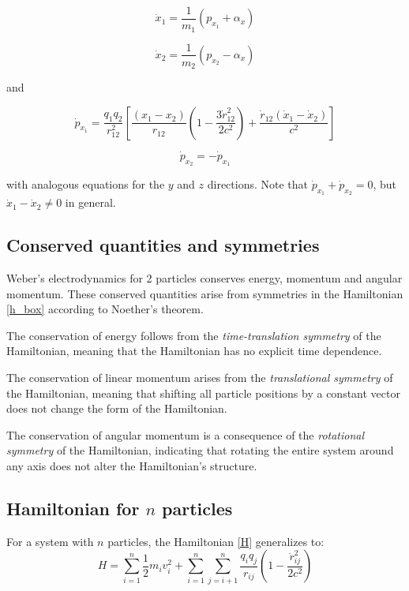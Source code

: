 \documentclass[12pt,a4paper]{article}
\theoremstyle{definition}
\theoremstyle{remark}
\begin{document}
\begin{equation}\label{xdot_two}
    \dot{x}_1 = \frac{1}{m_1} \left(p_{x_1} + \alpha_x\right)
\end{equation}

\begin{equation}\label{xdot_two_p2}
    \dot{x}_2 = \frac{1}{m_2} \left(p_{x_2} - \alpha_x\right)
\end{equation}

and

\begin{equation}\label{pdot_two}
    \dot{p}_{x_1} = \frac{q_1 q_2}{r_{12}^2}\left[\frac{(x_1 - x_2)}{r_{12}}\left(1 - \frac{3\dot{r}_{12}^2}{2 c^2}\right) + \frac{\dot{r}_{12}(\dot{x}_1 - \dot{x}_2)}{c^2}\right]
\end{equation}

\begin{equation}\label{pdot_two_p2}
    \dot{p}_{x_2} = -\dot{p}_{x_1}
\end{equation}

with analogous equations for the $y$ and $z$ directions. Note that $\dot{p}_{x_1} + \dot{p}_{x_2} = 0$, but $\dot{x}_1 - \dot{x}_2 \neq 0$ in general.

\subsection{Conserved quantities and symmetries}
Weber's electrodynamics for 2 particles conserves energy, momentum and angular momentum. These conserved quantities arise from symmetries in the Hamiltonian \eqref{h_box} according to Noether's theorem.

The conservation of energy follows from the \textit{time-translation symmetry} of the Hamiltonian, meaning that the Hamiltonian has no explicit time dependence.

The conservation of linear momentum arises from the \textit{translational symmetry} of the Hamiltonian, meaning that shifting all particle positions by a constant vector does not change the form of the Hamiltonian.

The conservation of angular momentum is a consequence of the \textit{rotational symmetry} of the Hamiltonian, indicating that rotating the entire system around any axis does not alter the Hamiltonian's structure.

\subsection{Hamiltonian for \texorpdfstring{$n$}{n} particles}
For a system with $n$ particles, the Hamiltonian \eqref{H} generalizes to:
\begin{equation}\label{hamiltonian}
    H = \sum_{i=1}^{n} \frac{1}{2} m_i v_i^2 + \sum_{i=1}^{n} \sum_{j=i+1}^{n} \frac{q_i q_j}{r_{ij}} \left(1 - \frac{\dot{r}_{ij}^2}{2 c^2}\right)
\end{equation}
\end{document}
